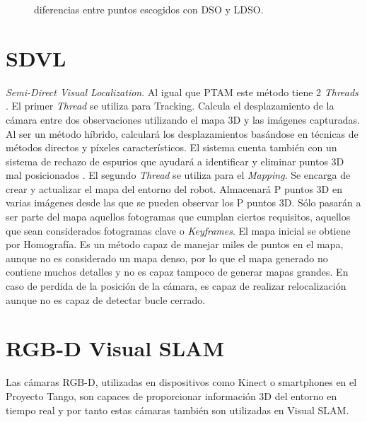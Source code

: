 \begin{figure}[H]
\begin{center}
\end{center}
\caption{diferencias entre puntos escogidos con DSO y LDSO.}
\end{figure}

\section{SDVL}
\textit{Semi-Direct Visual Localization}. Al igual que PTAM este método tiene 2 \textit{Threads} .
El primer \textit{Thread} se utiliza para Tracking. Calcula el desplazamiento de la cámara entre dos observaciones utilizando el mapa 3D y las imágenes capturadas. Al ser un método híbrido, calculará los desplazamientos basándose en técnicas de métodos directos y píxeles característicos. El sistema cuenta también con un sistema de rechazo de espurios que ayudará a identificar y eliminar puntos 3D mal posicionados \cite{Perdices17}.
El segundo \textit{Thread} se utiliza para el \textit{Mapping}.  Se encarga de crear y actualizar el mapa del entorno del robot. Almacenará P puntos 3D  en varias imágenes desde las que se pueden observar los P puntos 3D. Sólo pasarán a ser parte del mapa aquellos fotogramas que cumplan ciertos requisitos, aquellos que sean considerados fotogramas clave o \textit{Keyframes}.
El mapa inicial se obtiene por Homografía. Es un método capaz de manejar miles de puntos en el mapa, aunque no es considerado un mapa denso, por lo que el mapa generado no contiene muchos detalles y no es capaz tampoco de generar mapas grandes. En caso de perdida de la posición de la cámara, es capaz de realizar relocalización aunque no es capaz de detectar bucle cerrado.


\section{RGB-D Visual SLAM}
Las cámaras RGB-D, utilizadas en dispositivos como Kinect o smartphones en el Proyecto Tango, son capaces de proporcionar información 3D del entorno en tiempo real y por tanto estas cámaras también son utilizadas en Visual SLAM.

